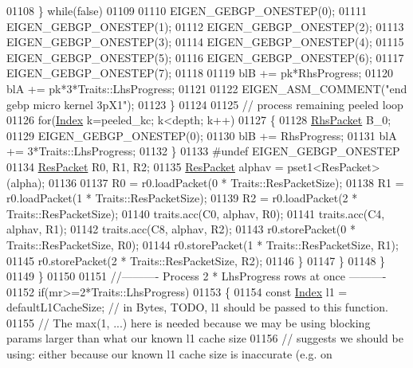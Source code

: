 \begin{DoxyCode}
01108 \textcolor{preprocessor}{            \} while(false)}
01109         
01110             EIGEN\_GEBGP\_ONESTEP(0);
01111             EIGEN\_GEBGP\_ONESTEP(1);
01112             EIGEN\_GEBGP\_ONESTEP(2);
01113             EIGEN\_GEBGP\_ONESTEP(3);
01114             EIGEN\_GEBGP\_ONESTEP(4);
01115             EIGEN\_GEBGP\_ONESTEP(5);
01116             EIGEN\_GEBGP\_ONESTEP(6);
01117             EIGEN\_GEBGP\_ONESTEP(7);
01118 
01119             blB += pk*RhsProgress;
01120             blA += pk*3*Traits::LhsProgress;
01121 
01122             EIGEN\_ASM\_COMMENT(\textcolor{stringliteral}{"end gebp micro kernel 3pX1"});
01123           \}
01124 
01125           \textcolor{comment}{// process remaining peeled loop}
01126           \textcolor{keywordflow}{for}(\hyperlink{namespace_eigen_a62e77e0933482dafde8fe197d9a2cfde}{Index} k=peeled\_kc; k<depth; k++)
01127           \{
01128             \hyperlink{class_eigen_1_1internal_1_1_tensor_lazy_evaluator_writable}{RhsPacket} B\_0;
01129             EIGEN\_GEBGP\_ONESTEP(0);
01130             blB += RhsProgress;
01131             blA += 3*Traits::LhsProgress;
01132           \}
01133 \textcolor{preprocessor}{#undef EIGEN\_GEBGP\_ONESTEP}
01134           \hyperlink{class_eigen_1_1internal_1_1_tensor_lazy_evaluator_writable}{ResPacket} R0, R1, R2;
01135           \hyperlink{class_eigen_1_1internal_1_1_tensor_lazy_evaluator_writable}{ResPacket} alphav = pset1<ResPacket>(alpha);
01136 
01137           R0 = r0.loadPacket(0 * Traits::ResPacketSize);
01138           R1 = r0.loadPacket(1 * Traits::ResPacketSize);
01139           R2 = r0.loadPacket(2 * Traits::ResPacketSize);
01140           traits.acc(C0, alphav, R0);
01141           traits.acc(C4, alphav, R1);
01142           traits.acc(C8, alphav, R2);
01143           r0.storePacket(0 * Traits::ResPacketSize, R0);
01144           r0.storePacket(1 * Traits::ResPacketSize, R1);
01145           r0.storePacket(2 * Traits::ResPacketSize, R2);          
01146           \}
01147         \}
01148       \}
01149     \}
01150 
01151     \textcolor{comment}{//---------- Process 2 * LhsProgress rows at once ----------}
01152     \textcolor{keywordflow}{if}(mr>=2*Traits::LhsProgress)
01153     \{
01154       \textcolor{keyword}{const} \hyperlink{namespace_eigen_a62e77e0933482dafde8fe197d9a2cfde}{Index} l1 = defaultL1CacheSize; \textcolor{comment}{// in Bytes, TODO, l1 should be passed to this function.}
01155       \textcolor{comment}{// The max(1, ...) here is needed because we may be using blocking params larger than what our known
       l1 cache size}
01156       \textcolor{comment}{// suggests we should be using: either because our known l1 cache size is inaccurate (e.g. on
}
\end{DoxyCode}
